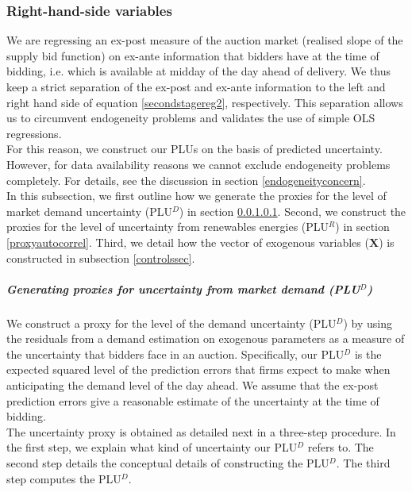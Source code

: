 \subsubsection{Right-hand-side variables}
\label{RHS}

We are regressing an ex-post measure of the auction market (realised slope of the supply bid function) on ex-ante information that bidders have at the time of bidding, i.e. which is available at midday of the day ahead of delivery.  
We thus keep a strict separation of the ex-post and ex-ante information to the left and right hand side of equation \ref{secondstagereg2}, respectively. This separation allows us to circumvent endogeneity problems and validates the use of simple OLS regressions. \\

For this reason, we construct our PLUs on the basis of predicted uncertainty. However, for data availability reasons we cannot exclude endogeneity problems completely. For details, see the discussion in section \ref{endogeneityconcern}.  \\

In this subsection, we first outline how we generate the proxies for the level of market demand uncertainty (PLU$^D$) in section \ref{proxyunc}. Second, we construct the proxies for the level of uncertainty from renewables energies (PLU$^R$) in section \ref{proxyautocorrel}. Third, we detail how the vector of exogenous variables ($\boldsymbol{X}$) is constructed in subsection \ref{controlssec}.  \\

\subparagraph{Generating proxies for uncertainty from market demand (PLU$^D$)}
\label{proxyunc}

We construct a proxy for the level of the demand uncertainty (PLU$^{D}$) by using the residuals from a demand estimation on exogenous parameters as a measure of the uncertainty that bidders face in an auction. Specifically, our PLU$^D$ is the expected squared level of the prediction errors that firms expect to make when anticipating the demand level of the day ahead. We assume that the ex-post prediction errors give a reasonable estimate of the uncertainty at the time of bidding. \\

The uncertainty proxy is obtained as detailed next in a three-step procedure. In the first step, we explain what kind of uncertainty our PLU$^D$ refers to. The second step details the conceptual details of constructing the PLU$^D$. The third step computes the PLU$^D$.

